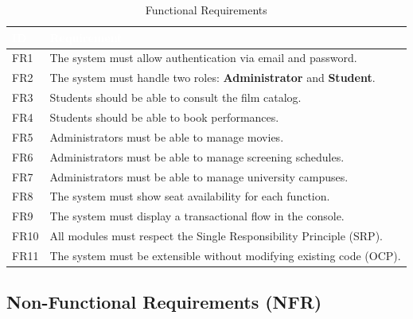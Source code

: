 \documentclass[12pt, letterpaper]{article}
\newcommand{\tableheader}[1]{\cellcolor{headerblue}\textcolor{white}{\textbf{#1}}}
\begin{document}
\begin{table}[H]
\centering
\caption{Functional Requirements}
\begin{tabularx}{0.95\textwidth}{|>{\centering\arraybackslash}p{}|X|}
\hline
\rowcolor{headerblue}
\tableheader{ID} & \tableheader{Requirement} \\
\hline
\cellcolor{lightblue}FR1 & The system must allow authentication via email and password. \\
\hline
FR2 & The system must handle two roles: \textbf{Administrator} and \textbf{Student}. \\
\hline
\cellcolor{lightblue}FR3 & Students should be able to consult the film catalog. \\
\hline
FR4 & Students should be able to book performances. \\
\hline
\cellcolor{lightblue}FR5 & Administrators must be able to manage movies. \\
\hline
FR6 & Administrators must be able to manage screening schedules. \\
\hline
\cellcolor{lightblue}FR7 & Administrators must be able to manage university campuses. \\
\hline
FR8 & The system must show seat availability for each function. \\
\hline
\cellcolor{lightblue}FR9 & The system must display a transactional flow in the console. \\
\hline
FR10 & All modules must respect the Single Responsibility Principle (SRP). \\
\hline
\cellcolor{lightblue}FR11 & The system must be extensible without modifying existing code (OCP). \\
\hline
\end{tabularx}
\end{table}

\subsection{Non-Functional Requirements (NFR)}
\end{document}
